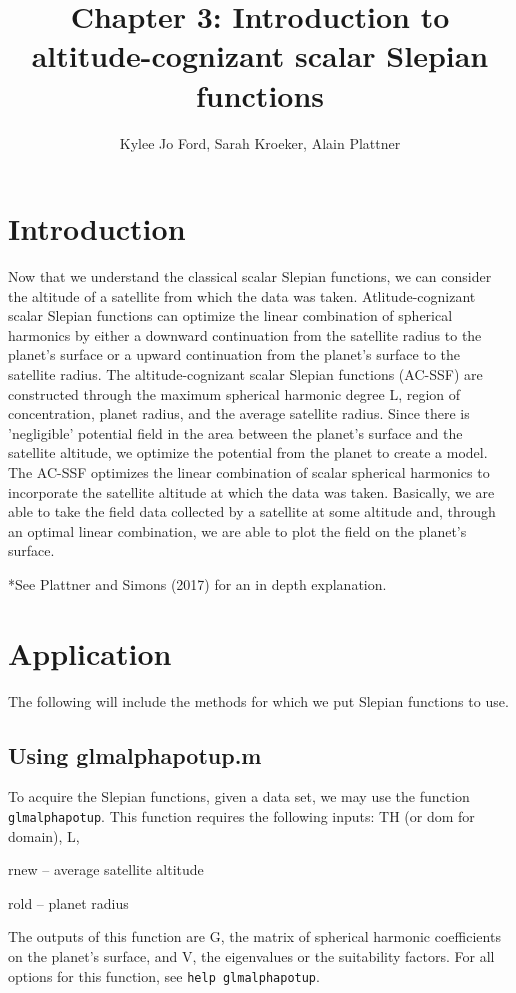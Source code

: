 \documentclass[11pt]{article}
\title{Chapter 3: Introduction to altitude-cognizant scalar Slepian functions}
\author{Kylee Jo Ford, Sarah Kroeker, Alain Plattner}
\begin{document}
\maketitle

\section{Introduction}

Now that we understand the classical scalar Slepian functions, we can consider the altitude of a satellite from which the data was taken.   Atlitude-cognizant scalar Slepian functions can optimize the linear combination of spherical harmonics by either a downward continuation from the satellite radius to the planet's surface or a upward continuation from the planet's surface to the satellite radius.  The altitude-cognizant scalar Slepian functions (AC-SSF) are constructed through the maximum spherical harmonic degree L, region of concentration, planet radius, and the average satellite radius.  Since there is 'negligible' potential field in the area between the planet's surface and the satellite altitude, we optimize the potential from the planet to create a model.  The AC-SSF optimizes the linear combination of scalar spherical harmonics to incorporate the satellite altitude at which the data was taken.  Basically, we are able to take the field data collected by a satellite at some altitude and, through an optimal linear combination, we are able to plot the field on the planet's surface. 

*See Plattner and Simons (2017) for an in depth explanation.

\section{Application}

The following will include the methods for which we put Slepian functions to use.  

\subsection{Using glmalphapotup.m}
To acquire the Slepian functions, given a data set, we may use the function \verb+glmalphapotup+.  This function requires the following inputs: TH (or dom for domain), L, 

rnew -- average satellite altitude

rold -- planet radius

The outputs of this function are G, the matrix of spherical harmonic coefficients on the planet's surface, and V, the eigenvalues or the suitability factors. For all options for this function, see \verb+help glmalphapotup+.  
\end{document}
